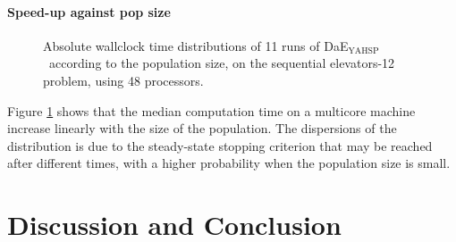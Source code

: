 \documentclass{sig-alternate}
\newcommand{\DAEYAHSP}{{\sc DaE$_{\text{YAHSP}}$}}
\begin{document}
\paragraph{Speed-up against pop size} %

\begin{figure}[htpb]
  \begin{center}
    \hfill
  \end{center}
  \caption{Absolute wallclock time distributions of 11 runs of \DAEYAHSP\ according to the population size, on the sequential elevators-12 problem, using 48 processors.}
  \label{fig:elevators_pop}
\end{figure}

Figure \ref{fig:elevators_pop} shows that the median computation time on a
multicore machine increase linearly with the size of the population. The 
dispersions of the distribution is due to the steady-state stopping criterion 
that may be reached after different times, with a higher probability when the
population size is small.

\section{Discussion and Conclusion}


%

%
%
\end{document}
